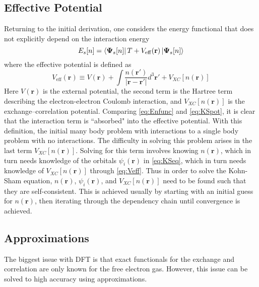 \documentclass[12pt]{article}
\begin{document}
\subsection{Effective Potential} %
Returning to the initial derivation, one considers the energy functional that does not explicitly depend on the interaction energy 
\begin{equation}\label{eq:KSpot}
    E_s[n] = \bra{\boldsymbol{\Psi}_s[n]}T+V_{\mathrm{eff}}(\textbf{r})\ket{\boldsymbol{\Psi}_s[n]} 
\end{equation}
where the effective potential is defined as 
\begin{equation}\label{eq:Veff}
    V_{\mathrm{eff}}(\textbf{r}) \equiv V(\textbf{r}) + \int \frac{n(\textbf{r}')}{|\textbf{r}-\textbf{r}'|}d^3\textbf{r}' + V_{XC}[n(\textbf{r})]
\end{equation}
Here $V(\textbf{r})$ is the external potential, the second term is the Hartree term describing the electron-electron Coulomb interaction, and $V_{XC}[n(\textbf{r})]$ is the exchange–correlation potential. Comparing \eqref{eq:Enfunc} and \eqref{eq:KSpot}, it is clear that the interaction term is ``absorbed" into the effective potential. With this definition, the initial many body problem with interactions to a single body problem with no interactions. The difficulty in solving this problem arises in the last term $V_{XC}[n(\textbf{r})]$. Solving for this term involves knowing $n(\textbf{r})$, which in turn needs knowledge of the orbitals $\psi_i(\textbf{r})$ in \eqref{eq:KSeq}, which in turn needs knowledge of $V_{XC}[n(\textbf{r})]$ through \eqref{eq:Veff}. Thus in order to solve the Kohn-Sham equation, $n(\textbf{r})$, $\psi_i(\textbf{r})$, and $V_{XC}[n(\textbf{r})]$ need to be found such that they are self-consistent. This is achieved usually by starting with an initial guess for $n(\textbf{r})$, then iterating through the dependency chain until convergence is achieved. 

\subsection{Approximations} %
The biggest issue with DFT is that exact functionals for the exchange and correlation are only known for the free electron gas. However, this issue can be solved to high accuracy using approximations. 
\end{document}
